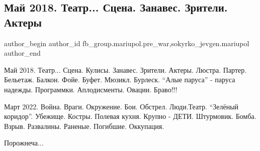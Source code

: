  
 
 
 
 

\subsection{Май 2018. Театр... Сцена. Занавес. Зрители. Актеры}
\label{sec:14_02_2023.fb.fb_group.mariupol.pre_war.1.mai_2018__teatr__sts}
 
\ifcmt
 author_begin
   author_id fb_group.mariupol.pre_war,sokyrko_jevgen.mariupol
 author_end
\fi

Май 2018. Театр... Сцена. Кулисы. Занавес. Зрители. Актеры. Люстра. Партер.
Бельетаж. Балкон. Фойе. Буфет. Мюзикл. Бурлеск. \enquote{Алые паруса} - паруса надежды.
Программки. Аплодисменты. Овации. Браво!!!

Март 2022. Война. Враги. Окружение. Бои. Обстрел. Люди.Театр. \enquote{Зелёный
коридор}. Убежище. Костры. Полевая кухня. Крупно - ДЕТИ. Штурмовик. Бомба.
Взрыв. Развалины. Раненые. Погибшие. Оккупация.

Порожнеча...
